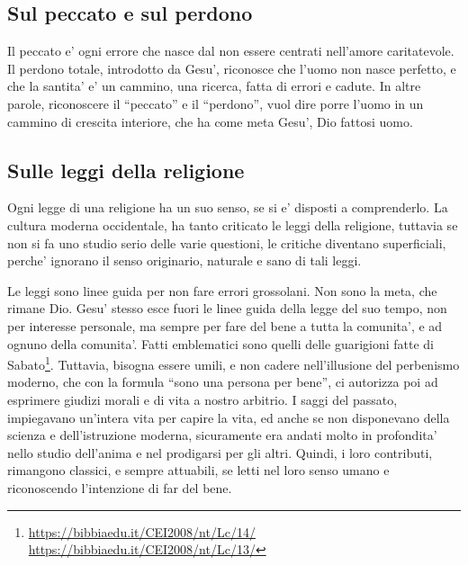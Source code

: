 \subsection{Sul peccato e sul perdono}

Il peccato e' ogni errore che nasce dal non essere centrati nell'amore caritatevole. Il perdono totale, introdotto da Gesu', riconosce che l'uomo non nasce perfetto, e che la santita' e' un cammino, una ricerca, fatta di errori e cadute. In altre parole, riconoscere il ``peccato'' e il ``perdono'', vuol dire porre l'uomo in un cammino di crescita interiore, che ha come meta Gesu', Dio fattosi uomo.

\subsection{Sulle leggi della religione}

Ogni legge di una religione ha un suo senso, se si e' disposti a comprenderlo. La cultura moderna occidentale, ha tanto criticato le leggi della religione, tuttavia se non si fa uno studio serio delle varie questioni, le critiche diventano superficiali, perche' ignorano il senso originario, naturale e sano di tali leggi.

Le leggi sono linee guida per non fare errori grossolani. Non sono la meta, che rimane Dio. Gesu' stesso esce fuori le linee guida della legge del suo tempo, non per interesse personale, ma sempre per fare del bene a tutta la comunita', e ad ognuno della comunita'. Fatti emblematici sono quelli delle guarigioni fatte di Sabato\footnote{\url{https://bibbiaedu.it/CEI2008/nt/Lc/14/} \url{https://bibbiaedu.it/CEI2008/nt/Lc/13/}}. Tuttavia, bisogna essere umili, e non cadere nell'illusione del perbenismo moderno, che con la formula ``sono una persona per bene'', ci autorizza poi ad esprimere giudizi morali e di vita a nostro arbitrio. I saggi del passato, impiegavano un'intera vita per capire la vita, ed anche se non disponevano della scienza e dell'istruzione moderna, sicuramente era andati molto in profondita' nello studio dell'anima e nel prodigarsi per gli altri. Quindi, i loro contributi, rimangono classici, e sempre attuabili, se letti nel loro senso umano e riconoscendo l'intenzione di far del bene.

